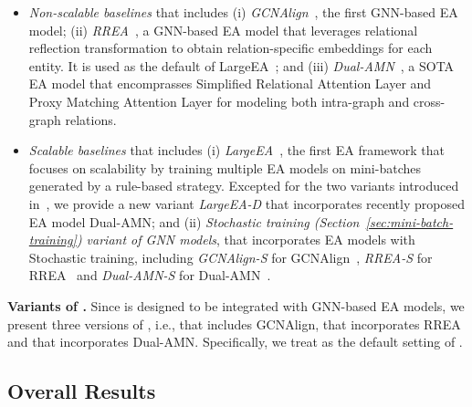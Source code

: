 {%
\begin{itemize}[topsep=0pt,itemsep=0pt,parsep=0pt,partopsep=0pt,leftmargin=*]
    \item \emph{Non-scalable baselines} that includes 
            (i) \emph{GCNAlign}~\cite{GCN-Align18}, the first GNN-based EA model; 
            (ii) \emph{RREA}~\cite{RREA20}, a GNN-based EA model that leverages relational reflection transformation to obtain relation-specific embeddings for each entity. It is used as the default of LargeEA~\cite{LargeEA22}; and
            (iii) \emph{Dual-AMN}~\cite{DualAMN21}, a SOTA EA model that encomprasses Simplified Relational Attention Layer and Proxy Matching Attention Layer for modeling both intra-graph and cross-graph relations.
    \item \emph{Scalable baselines} that includes 
            (i) \emph{LargeEA}~\cite{LargeEA22}, the first EA framework that focuses on scalability by training multiple EA models on mini-batches generated by a rule-based strategy. Excepted for the two variants introduced in~\cite{LargeEA22}, 
            we provide a new variant \emph{LargeEA-D} that incorporates recently proposed EA model Dual-AMN; and
            (ii) \emph{Stochastic training (Section~\ref{sec:mini-batch-training}) variant of GNN models}, that incorporates EA models with Stochastic training, including \emph{GCNAlign-S} for GCNAlign~\cite{GCN-Align18}, \emph{RREA-S} for RREA~\cite{RREA20} and \emph{Dual-AMN-S} for Dual-AMN~\cite{DualAMN21}.
\end{itemize}
}


\noindent
\textbf{Variants of \ClusterEA{}.}
Since \ClusterEA{} is designed to be integrated with GNN-based EA models, we present three versions of \ClusterEA{}, i.e.,   that includes GCNAlign,  that incorporates RREA and   that incorporates Dual-AMN. Specifically, we treat  as the default setting of \ClusterEA{}. 

\subsection{Overall Results}


